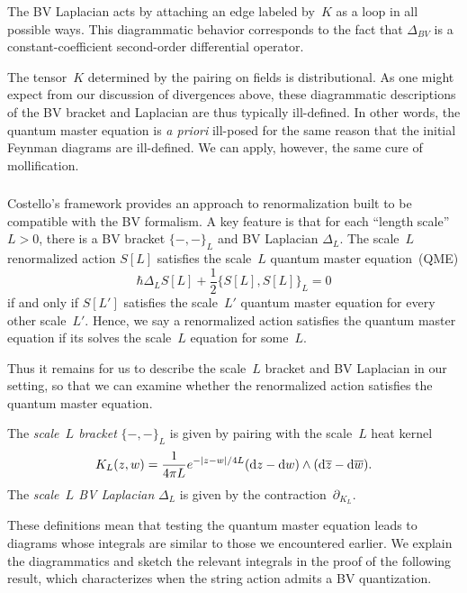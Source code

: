 The BV Laplacian acts by attaching an edge labeled by~$K$ as a loop in all possible ways.
This diagrammatic behavior corresponds to the fact that $\Delta_{BV}$ is a constant-coefficient second-order differential operator.

The tensor~$K$ determined by the pairing on fields is distributional.
As one might expect from our discussion of divergences above,
these diagrammatic descriptions of the BV bracket and Laplacian are thus typically ill-defined.
In other words, the quantum master equation is {\em a priori} ill-posed for the same reason that the initial Feynman diagrams are ill-defined.
We can apply, however, the same cure of mollification.

\subsubsection{}

Costello's framework \cite{CosBook} provides an approach to renormalization built to be compatible with the BV formalism.
A key feature is that for each ``length scale''~$L>0$, 
there is a BV bracket $\{-,-\}_L$ and BV Laplacian $\Delta_L$.
The scale~$L$ renormalized action $S[L]$ satisfies the scale~$L$ quantum master equation~(QME)
\[
\hbar \Delta_{L} S[L] + \frac{1}{2}\{S[L],S[L]\}_L = 0
\]
if and only if $S[L']$ satisfies the scale~$L'$ quantum master equation for every other scale~$L'$.
Hence, we say a renormalized action satisfies the quantum master equation if its solves the scale~$L$ equation for some~$L$.

Thus it remains for us to describe the scale~$L$ bracket and BV Laplacian in our setting,
so that we can examine whether the renormalized action satisfies the quantum master equation.

\begin{dfn}
The {\em scale~$L$ bracket} $\{-,-\}_L$ is given by pairing with the scale~$L$ heat kernel
\[
K_L(z,w) = \frac{1}{4\pi L} e^{-|z-w|/4L} ({\rm d} z - {\rm d} w) \wedge ({\rm d}\overline{z} - {\rm d}\overline{w}). 
\]
The {\em scale~$L$ BV Laplacian} $\Delta_L$ is given by the contraction~$\partial_{K_L}$.
\end{dfn}

These definitions mean that testing the quantum master equation leads to diagrams whose integrals are similar to those we encountered earlier.
We explain the diagrammatics and sketch the relevant integrals in the proof of the following result,
which characterizes when the string action admits a BV quantization.


